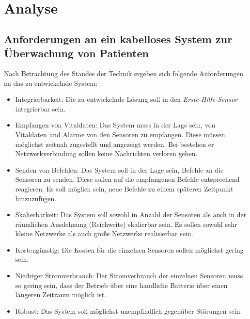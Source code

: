 \chapter{Analyse}
    \section{Anforderungen an ein kabelloses System zur Überwachung von Patienten}
        Nach Betrachtung des Standes der Technik ergeben sich folgende Anforderungen
        an das zu entwickelnde System:
        
        \begin{itemize}
            \item{Integrierbarkeit:} Die zu entwickelnde Lösung soll in den \emph{Erste-Hilfe-Sensor}
                                     integrierbar sein.
            \item{Empfangen von Vitaldaten:} Das System muss in der Lage sein, von Vitaldaten und Alarme  
                                             von den Sensoren zu empfangen. Diese müssen möglichst zeitnah
                                             zugestellt und angezeigt werden. Bei bestehen er Netzwerkverbindung
                                             sollen keine Nachrichten verloren gehen. 
            \item{Senden von Befehlen:} Das System soll in der Lage sein, Befehle an die Sensoren zu senden.
                                        Diese sollen auf die empfangenen Befehle entsprechend reagieren. Es
                                        soll möglich sein, neue Befehle zu einem späteren Zeitpunkt hinzuzufügen.
            \item{Skalierbarkeit:} Das System soll sowohl in Anzahl der Sensoren als auch in der räumlichen 
                                   Ausdehnung (Reichweite) skalierbar sein. Es sollen sowohl sehr kleine Netzwerke
                                   als auch große Netzwerke realisierbar sein.
            \item{Kostengünstig:} Die Kosten für die einzelnen Sensoren sollen möglichst gering sein.
            \item{Niedriger Stromverbrauch:} Der Stromverbrauch der einzelnen Sensoren muss so gering sein, dass
                                             der Betrieb über eine handliche Batterie über einen längeren 
                                             Zeitraum möglich ist.
            \item{Robust:} Das System soll möglichst unempfindlich gegenüber Störungen sein.

\end{itemize}
